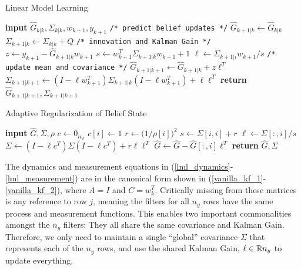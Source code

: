   \begin{algorithm} 
	\begin{algorithmic}[1]
		\caption{Linear Model Learning}\label{alg:lml}
		\State \textbf{input} $\hat{G}_{k|k}, \Sigma_{k|k}, w_{k+1}, y_{k+1}$ 
            \State \texttt{/* predict belief updates */}
            \State $\hat{G}_{k+1|k} \leftarrow \hat{G}_{k|k}$ 
            \State $\Sigma_{k+1|k}\leftarrow \Sigma_{k|k} + Q$ 
            \State \texttt{/* innovation and Kalman Gain */}
            \State $z \leftarrow y_{k+1} - \hat{G}_{k+1|k} w_{k+1}$ 
            \State $s \leftarrow w_{k+1}^T \Sigma_{k+1|k} w_{k+1} + 1$ 
            \State $\ell \leftarrow \Sigma_{k+1|i} w_{k+1} / s $ 
            \State \texttt{/* update mean and covariance */} 
            \State $\hat{G}_{k+1|k+1} \leftarrow \hat{G}_{k+1|k} + z\ell^T  $ 
            \State $\Sigma_{k+1|k+1} \leftarrow (I - \ell w_{k+1}^T)\Sigma_{k+1|k}(I - \ell w_{k + 1}^T) + \ell \ell^T$ 
		\State \textbf{return} $\hat{G}_{k+1|k+1}, \Sigma_{k+1|k+1}$ 
	\end{algorithmic}
\end{algorithm}

\begin{algorithm} 
	\begin{algorithmic}[1]
		\caption{Adaptive Regularization of Belief State}\label{alg:adapt}
		\State \textbf{input} $\hat{G}, \Sigma, \rho$ 
             
            \State $c \leftarrow 0_{n_w}$ 
        \State $c[i] \leftarrow 1 $
        \State $r \leftarrow {(1}/{\rho[i])^2}$ 
        \State $s \leftarrow \Sigma[i, i] + r$ 
        \State $\ell \leftarrow \Sigma[:,i] / s$  
        \State $\Sigma \leftarrow (I - \ell c^T)\Sigma(I - \ell c^T) + r\ell \ell^T$
        \State $\hat{G}\leftarrow \hat{G} -\hat{G}[:,i]\ell^T$
            \EndFor
            \State \textbf{return} $\hat{G}, \Sigma$
	\end{algorithmic}
\end{algorithm}


The dynamics and measurement equations in (\ref{lml_dynamics}-\ref{lml_measurement}) are in the canonical form shown in (\ref{vanilla_kf_1}-\ref{vanilla_kf_2}), where $A = I$ and $C = w_k^T$.  Critically missing from these matrices is any reference to row $j$, meaning the filters for all $n_y$ rows have the same process and measurement functions. This enables two important commonalities amongst the $n_y$ filters: They all share the same covariance and Kalman Gain. Therefore, we only need to maintain a single ``global'' covariance $\Sigma$ that represents each of the $n_y$ rows, and use the shared Kalman Gain, $\ell \in \mathbb{R}{n_y}$ to update everything.

